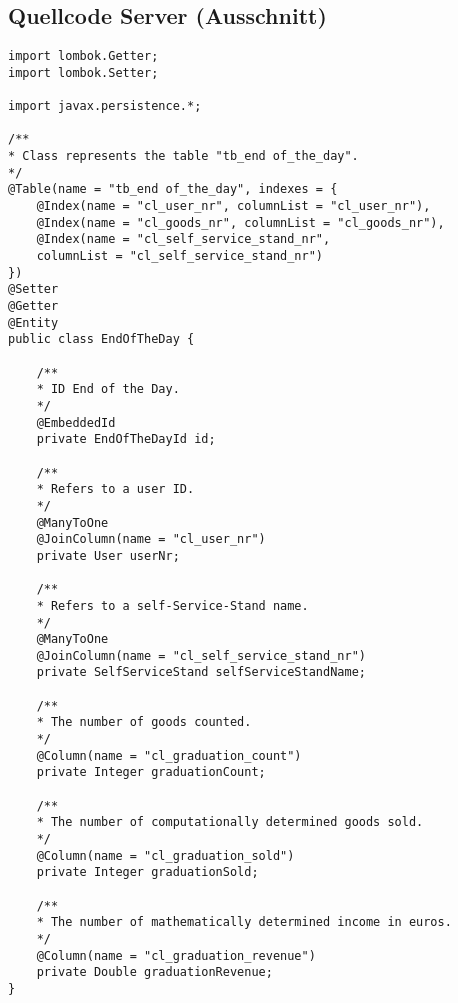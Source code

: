 \subsection *{Quellcode Server (Ausschnitt)}\label{QuellcodeServer}


\lstset{language=java}
\begin{lstlisting}[frame=tb, caption={Das Listing zeigt die Klasse EndOfTheDay im Paket model}, label={lst:EndOfTheDay}]
import lombok.Getter;
import lombok.Setter;

import javax.persistence.*;

/**
* Class represents the table "tb_end of_the_day".
*/
@Table(name = "tb_end of_the_day", indexes = {
	@Index(name = "cl_user_nr", columnList = "cl_user_nr"),
	@Index(name = "cl_goods_nr", columnList = "cl_goods_nr"),
	@Index(name = "cl_self_service_stand_nr", 
	columnList = "cl_self_service_stand_nr")
})
@Setter
@Getter
@Entity
public class EndOfTheDay {
	
	/**
	* ID End of the Day.
	*/
	@EmbeddedId
	private EndOfTheDayId id;
	
	/**
	* Refers to a user ID.
	*/
	@ManyToOne
	@JoinColumn(name = "cl_user_nr")
	private User userNr;
	
	/**
	* Refers to a self-Service-Stand name.
	*/
	@ManyToOne
	@JoinColumn(name = "cl_self_service_stand_nr")
	private SelfServiceStand selfServiceStandName;
	
	/**
	* The number of goods counted.
	*/
	@Column(name = "cl_graduation_count")
	private Integer graduationCount;
	
	/**
	* The number of computationally determined goods sold.
	*/
	@Column(name = "cl_graduation_sold")
	private Integer graduationSold;
	
	/**
	* The number of mathematically determined income in euros.
	*/
	@Column(name = "cl_graduation_revenue")
	private Double graduationRevenue;
}
\end{lstlisting}


